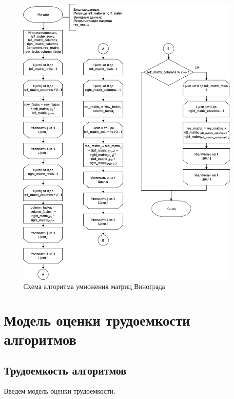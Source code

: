 \newpage 
\begin{figure}[h!]
	\begin{center}
		\includegraphics[scale=0.6]{assets/multVin.png}
	\end{center}
	\caption{Схема алгоритма умножения матриц Винограда}
\end{figure}

\newpage
\section{Модель оценки трудоемкости алгоритмов}

\subsection{Трудоемкость алгоритмов}

Введем модель оценки трудоемкости.

